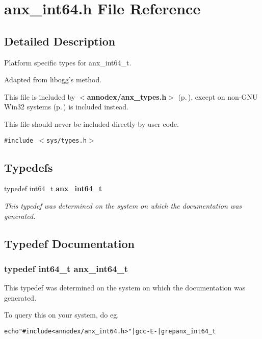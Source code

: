 \section{anx\_\-int64.h File Reference}
\label{anx__int64_8h}


\subsection{Detailed Description}
Platform specific types for anx\_\-int64\_\-t. 

Adapted from libogg's method.

This file is included by {\bf $<$annodex/anx\_\-types.h$>$ }{\rm (p.\,\pageref{anx__types_8h})}, except on non-GNU Win32 systems {\bf }{\rm (p.\,\pageref{anx__int64__w32_8h})} is included instead.

This file should never be included directly by user code.

{\tt \#include $<$sys/types.h$>$}\par
\subsection*{Typedefs}
\begin{CompactItemize}
\item 
typedef int64\_\-t {\bf anx\_\-int64\_\-t}
\begin{CompactList}\small\item\em This typedef was determined on the system on which the documentation was generated. \item\end{CompactList}\end{CompactItemize}


\subsection{Typedef Documentation}
\subsubsection{\setlength{\rightskip}{0pt plus 5cm}typedef int64\_\-t {\bf anx\_\-int64\_\-t}}\label{anx__int64_8h_a0}


This typedef was determined on the system on which the documentation was generated. 

To query this on your system, do eg.

\small\begin{alltt}
   echo "#include <annodex/anx\_int64.h>" | gcc -E - | grep anx\_int64\_t
 \end{alltt}\normalsize 
 